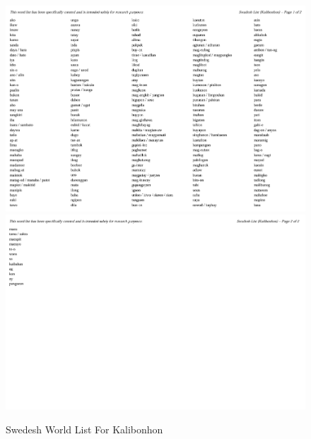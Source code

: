 \begin{figure}[h!]
	\centering
	\includegraphics[width=\textwidth]{./appendix/swadesh_kalibo1.png}
	\includegraphics[width=\textwidth]{./appendix/swadesh_kalibo2.png}
	\caption{Swedesh World List For Kalibonhon}
	\label{fig:swadeshKalibo}
\end{figure}

